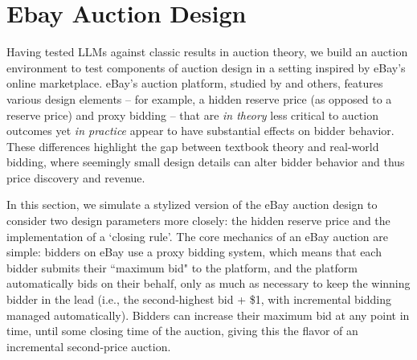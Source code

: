 \documentclass{article} %
\newcommand{\kibitz}[2]{\ifnum\Comments=1{\color{#1}{#2}}\fi}
\newcommand{\dcp}[1]{\kibitz{teal}{[DCP: #1]}}
\begin{document}

\section{Ebay Auction Design}\label{session:ebay}

Having tested LLMs against classic results in auction theory, we  build an auction environment to test components of auction design in a setting inspired by eBay's online marketplace. eBay's auction platform, studied by \citet{einav2011learning} and others, features various design elements -- for example, a hidden reserve price (as opposed to a reserve price)
and proxy bidding -- that are \emph{in theory} less critical to auction outcomes
yet \emph{in practice} appear to have substantial effects on bidder behavior. These differences highlight the gap between textbook theory and real-world bidding, where seemingly small design details can alter bidder behavior and thus price discovery and revenue.


In this section, we simulate a stylized version of the eBay auction design to consider two design parameters more closely: the hidden reserve price and the implementation of a `closing rule'. The core mechanics of an eBay auction are simple: bidders on eBay use a proxy bidding system, which means that each bidder submits their ``maximum bid" to the platform, and the platform automatically bids on their behalf, only as much as necessary to keep the winning bidder in the lead (i.e., the second-highest bid + \$1, with incremental bidding managed automatically).
Bidders can increase their maximum bid at any point in time, until some closing time of 
the auction, giving this the flavor
of an incremental second-price auction.

\end{document}
